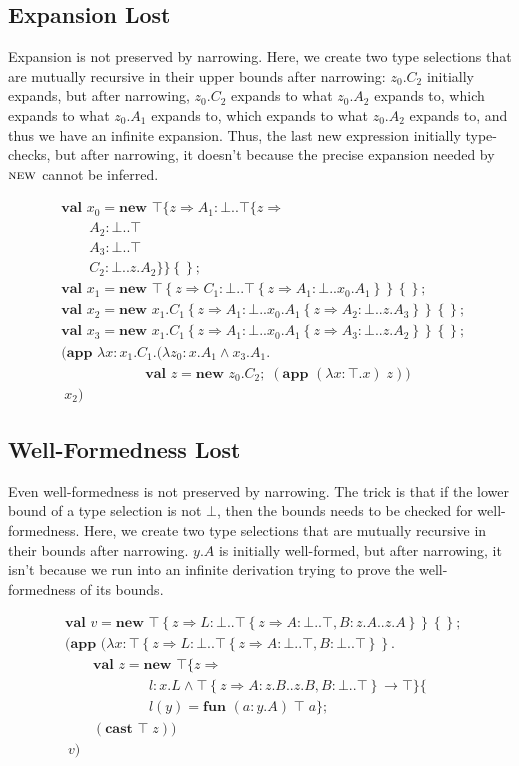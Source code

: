 \documentclass[9pt]{sigplanconf}
\newcommand{\gap}{\quad\quad}
\newcommand{\tfun}{\rightarrow}
\newcommand{\tand}{\wedge}
\newcommand{\refine}[2]{\left\{#1 \Rightarrow #2 \right\}}
\newcommand{\mlrefine}[2]{\{#1 \Rightarrow #2 \}}
\newcommand{\ldefs}[1]{\left\{#1\right\}}
\newcommand{\mlldefs}[1]{\{#1\}}
\newcommand{\abs}[3]{\lambda #1\!:\!#2.#3}
\newcommand{\new}[3]{\textbf{val }#1 = \textbf{new }#2 ;\; #3}
\newcommand{\mlnew}[3]{\textbf{val }#1 = \textbf{new }#2 ;\;\\&#3}
\newcommand{\Ldecl}[3]{#1 : #2..#3}%
\newcommand{\mdecl}[3]{#1 : #2 \tfun #3}
\newcommand{\Top}{\top}%
\newcommand{\Bot}{\bot}%
\newcommand{\fun}[4]{\textbf{fun } (#1:#2)\;#3\;#4}
\newcommand{\app}[2]{(\textbf{app }#1\;#2)}
\newcommand{\mlapp}[2]{(\textbf{app }#1\;\\&#2)}
\newcommand{\cast}[2]{(\textbf{cast }#1\;#2)}
\begin{document}
\subsection{Expansion Lost}\label{narrowing_exp}

Expansion is not preserved by narrowing. Here, we create two type
selections that are mutually recursive in their upper bounds after
narrowing: $z_0.C_2$ initially expands, but after narrowing, $z_0.C_2$
expands to what $z_0.A_2$ expands to, which expands to what $z_0.A_1$
expands to, which expands to what $z_0.A_2$ expands to, and thus we
have an infinite expansion. Thus, the last new expression initially
type-checks, but after narrowing, it doesn't because the precise
expansion needed by $\textsc{new}$ cannot be inferred.

\begin{align*}
&\mlnew {x_0} {\Top \mlrefine z { \Ldecl {A_1} \Bot {\Top \mlrefine z {\\
&\gap\Ldecl {A_2} \Bot \Top\\
&\gap\Ldecl {A_3} \Bot \Top\\
&\gap\Ldecl {C_2} \Bot {z.A_2}}}}\ldefs{}}{
\mlnew {x_1} {\Top \refine z {\Ldecl {C_1} \Bot {\Top \refine z {\Ldecl {A_1} \Bot {x_0.A_1}}}}\ldefs{}}}{
\mlnew {x_2} {{x_1.C_1} \refine z {\Ldecl {A_1} \Bot {{x_0.A_1} \refine z {\Ldecl {A_2} \Bot {z.A_3}}}}\ldefs{}}}{
\mlnew {x_3} {{x_1.C_1} \refine z {\Ldecl {A_1} \Bot {{x_0.A_1} \refine z {\Ldecl {A_3} \Bot {z.A_2}}}}\ldefs{}}}{
\mlapp {\abs x {x_1.C_1} {(\abs {z_0} {x.A_1 \tand x_3.A_1} {\\&\gap\gap\gap\new z {z_0.C_2} {\app {(\abs x \Top x)} z}})}} {\ x_2}}
\end{align*}

\subsection{Well-Formedness Lost}\label{narrowing_wf}

Even well-formedness is not preserved by narrowing. The trick is that
if the lower bound of a type selection is not $\Bot$, then the
bounds needs to be checked for well-formedness. Here, we create two
type selections that are mutually recursive in their bounds
after narrowing. $y.A$ is initially well-formed, but after narrowing,
it isn't because we run into an infinite derivation trying to prove
the well-formedness of its bounds.

\begin{align*}
&\mlnew v {\Top \refine z {\Ldecl L \Bot {\Top \refine z {\Ldecl A \Bot \Top, \Ldecl B {z.A} {z.A}}}} \ldefs{}}{
\mlapp {(\abs x {\Top \refine z {\Ldecl L \Bot {\Top \refine z {\Ldecl A \Bot \Top, \Ldecl B \Bot \Top}}}} {\\&\gap
\mlnew z {\Top \mlrefine z {\\&\gap\gap\gap
\mdecl l {x.L \tand {\Top \refine z {\Ldecl A {z.B} {z.B}, \Ldecl B \Bot \Top}}} \Top}\mlldefs{\\&\gap\gap\gap
l(y) = \fun a {y.A} \Top a}}{
\gap \cast {\top} z
}})}{\ v}}
\end{align*}
\end{document}

